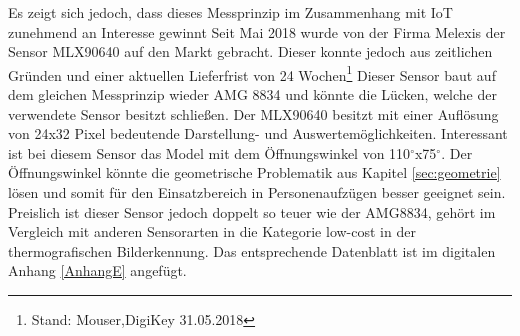 Es zeigt sich jedoch, dass dieses Messprinzip im Zusammenhang mit \ac{IoT} zunehmend an Interesse gewinnt   Seit Mai 2018 wurde von der Firma Melexis der Sensor MLX90640 auf den Markt gebracht. Dieser konnte jedoch aus zeitlichen Gründen und einer aktuellen Lieferfrist von 24 Wochen\footnote{Stand: Mouser,DigiKey 31.05.2018 }
Dieser Sensor baut auf dem gleichen Messprinzip wieder AMG 8834 und könnte die Lücken, welche der verwendete Sensor besitzt schließen. Der MLX90640 besitzt mit einer Auflösung von 24x32 Pixel bedeutende Darstellung- und Auswertemöglichkeiten. Interessant ist bei diesem Sensor das Model mit dem Öffnungswinkel von 110$^\circ$x75$^\circ$. Der Öffnungswinkel könnte die geometrische Problematik aus Kapitel \ref{sec:geometrie} lösen und somit für den Einsatzbereich in Personenaufzügen besser geeignet sein. Preislich ist dieser Sensor jedoch doppelt so teuer wie der AMG8834, gehört im Vergleich mit anderen Sensorarten in die Kategorie low-cost in der thermografischen Bilderkennung. Das entsprechende Datenblatt ist im digitalen Anhang \ref{AnhangE} angefügt. 




